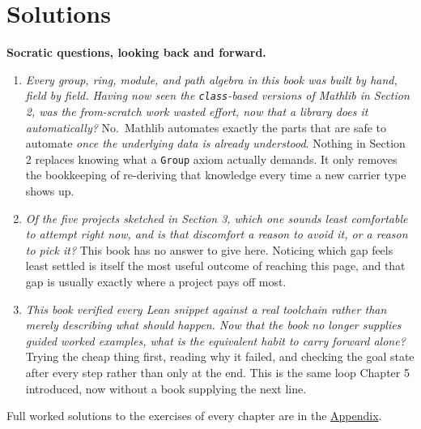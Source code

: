 \section{Solutions}\label{sec:14-next-steps:04-solutions:1}

\textbf{Socratic questions, looking back and forward.}

\begin{enumerate}
\def\labelenumi{\arabic{enumi}.}
\tightlist
\item
  \emph{Every group, ring, module, and path algebra in this book was built by hand, field by field. Having now seen the \texttt{class}-based versions of Mathlib in Section 2, was the from-scratch work wasted effort, now that a library does it automatically?} No.~Mathlib automates exactly the parts that are safe to automate \emph{once the underlying data is already understood}. Nothing in Section 2 replaces knowing what a \texttt{Group} axiom actually demands. It only removes the bookkeeping of re-deriving that knowledge every time a new carrier type shows up.
\item
  \emph{Of the five projects sketched in Section 3, which one sounds least comfortable to attempt right now, and is that discomfort a reason to avoid it, or a reason to pick it?} This book has no answer to give here. Noticing which gap feels least settled is itself the most useful outcome of reaching this page, and that gap is usually exactly where a project pays off most.
\item
  \emph{This book verified every Lean snippet against a real toolchain rather than merely describing what should happen. Now that the book no longer supplies guided worked examples, what is the equivalent habit to carry forward alone?} Trying the cheap thing first, reading why it failed, and checking the goal state after every step rather than only at the end. This is the same loop Chapter 5 introduced, now without a book supplying the next line.
\end{enumerate}

Full worked solutions to the exercises of every chapter are in the \hyperref[sec:15-appendix-solutions:00-index:1]{Appendix}.
